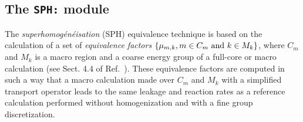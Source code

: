 \subsection{The {\tt SPH:} module}\label{sect:SPHData}

The {\sl superhomog\'en\'eisation} (SPH) equivalence technique is based on the calculation of a set of {\sl equivalence factors}
$\{\mu_{m,k}, m \in C_m \ {\rm and} \ k \in M_k\}$, where $C_m$ and $M_k$ is a macro region and a coarse energy group of a full-core or macro calculation (see Sect. 4.4 of Ref.~). These equivalence factors are computed in such a way that a macro calculation made over $C_m$ and $M_k$ with a simplified transport operator leads to the same leakage and reaction rates as a reference calculation performed without homogenization and with a fine group discretization.

\vskip 0.08cm

